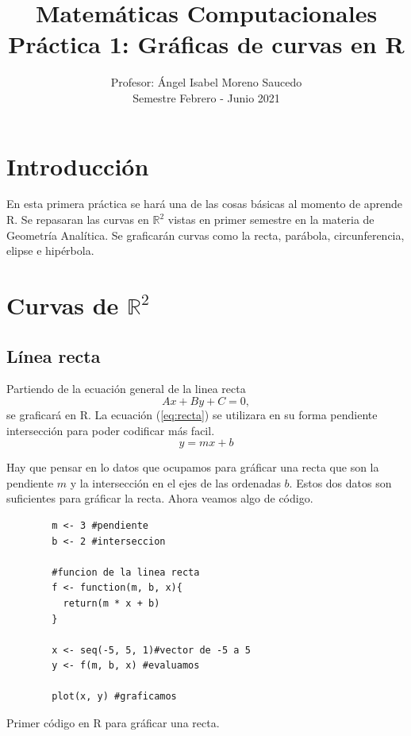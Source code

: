 \documentclass[12pt,a4paper]{article} %
\title{Matemáticas Computacionales \\ Práctica 1: Gráficas de curvas en R} %
\author{Profesor: Ángel Isabel Moreno Saucedo \\ Semestre Febrero - Junio 2021} %
\date{}
\begin{document}
\maketitle %

\section{Introducci\'{o}n}\label{sec:intro} %

En esta primera práctica se hará una de las cosas básicas al momento de aprende R. Se repasaran las curvas en $\mathbb{R}^2$ vistas en primer semestre en la materia de Geometría Analítica\citep{geometria}. Se graficarán curvas como la recta, parábola, circunferencia, elipse e hipérbola.

\section{Curvas de $\mathbb{R}^2$} \label{sec:curvas}

\subsection{Línea recta} \label{subsec:linearecta}

Partiendo de la ecuación general de la linea recta
\begin{equation}
Ax + By + C = 0, \label{eq:recta}
\end{equation}
se graficará en R. La ecuación (\ref{eq:recta}) se utilizara en su forma pendiente intersección para poder codificar más facil.
\begin{equation}
y = mx + b \label{eq:pendienteinterseccion}
\end{equation}

Hay que pensar en lo datos que ocupamos para gráficar una recta que son la pendiente $m$ y la intersección en el ejes de las ordenadas $b$. Estos dos datos son suficientes para gráficar la recta. Ahora veamos algo de código.

\begin{table}[htpb]
	\begin{lstlisting}
		m <- 3 #pendiente
		b <- 2 #interseccion

		#funcion de la linea recta
		f <- function(m, b, x){
		  return(m * x + b)
		}

		x <- seq(-5, 5, 1)#vector de -5 a 5
		y <- f(m, b, x) #evaluamos

		plot(x, y) #graficamos
	\end{lstlisting}
	\caption{Primer código en R para gráficar una recta.}
	\label{alg:recta0}
\end{table}
\end{document}
